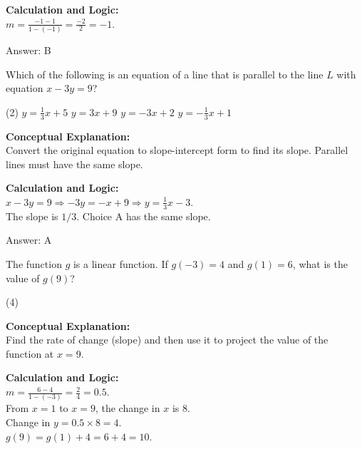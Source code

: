 \documentclass[11pt,paper=a4,answers]{exam}
\begin{document}
\begin{questions}
\begin{solution}
\vspace{10pt}
\textbf{Calculation and Logic:} \\
$m = \frac{-1 - 1}{1 - (-1)} = \frac{-2}{2} = -1$.

\vspace{15pt}
Answer: \colorbox{yellow!100}{B}
\end{solution}

\vspace{20pt}

\question
Which of the following is an equation of a line that is parallel to the line $L$ with equation $x - 3y = 9$?
\begin{tasks}(2)
    \task $y = \frac{1}{3}x + 5$
    \task $y = 3x + 9$
    \task $y = -3x + 2$
    \task $y = -\frac{1}{3}x + 1$
\end{tasks}

\begin{solution}
\textbf{Conceptual Explanation:} \\
Convert the original equation to slope-intercept form to find its slope. Parallel lines must have the same slope.

\vspace{10pt}
\textbf{Calculation and Logic:} \\
$x - 3y = 9 \Rightarrow -3y = -x + 9 \Rightarrow y = \frac{1}{3}x - 3$. \\
The slope is $1/3$. Choice A has the same slope.

\vspace{15pt}
Answer: \colorbox{yellow!100}{A}
\end{solution}

\vspace{20pt}

\question
The function $g$ is a linear function. If $g(-3) = 4$ and $g(1) = 6$, what is the value of $g(9)$?
\begin{tasks}(4)
\end{tasks}

\begin{solution}
\textbf{Conceptual Explanation:} \\
Find the rate of change (slope) and then use it to project the value of the function at $x = 9$.

\vspace{10pt}
\textbf{Calculation and Logic:} \\
$m = \frac{6 - 4}{1 - (-3)} = \frac{2}{4} = 0.5$. \\
From $x = 1$ to $x = 9$, the change in $x$ is 8. \\
Change in $y = 0.5 \times 8 = 4$. \\
$g(9) = g(1) + 4 = 6 + 4 = 10$.


\end{solution}
\end{questions}
\end{document}
